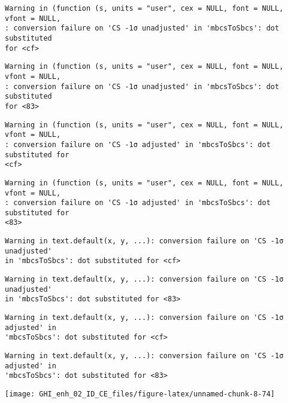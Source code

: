 \documentclass[
  10pt,
  a4paper,oneside]{article}
\begin{document}
\begin{verbatim}
Warning in (function (s, units = "user", cex = NULL, font = NULL, vfont = NULL,
: conversion failure on 'CS -1σ unadjusted' in 'mbcsToSbcs': dot substituted
for <cf>
\end{verbatim}

\begin{verbatim}
Warning in (function (s, units = "user", cex = NULL, font = NULL, vfont = NULL,
: conversion failure on 'CS -1σ unadjusted' in 'mbcsToSbcs': dot substituted
for <83>
\end{verbatim}

\begin{verbatim}
Warning in (function (s, units = "user", cex = NULL, font = NULL, vfont = NULL,
: conversion failure on 'CS -1σ adjusted' in 'mbcsToSbcs': dot substituted for
<cf>
\end{verbatim}

\begin{verbatim}
Warning in (function (s, units = "user", cex = NULL, font = NULL, vfont = NULL,
: conversion failure on 'CS -1σ adjusted' in 'mbcsToSbcs': dot substituted for
<83>
\end{verbatim}

\begin{verbatim}
Warning in text.default(x, y, ...): conversion failure on 'CS -1σ unadjusted'
in 'mbcsToSbcs': dot substituted for <cf>
\end{verbatim}

\begin{verbatim}
Warning in text.default(x, y, ...): conversion failure on 'CS -1σ unadjusted'
in 'mbcsToSbcs': dot substituted for <83>
\end{verbatim}

\begin{verbatim}
Warning in text.default(x, y, ...): conversion failure on 'CS -1σ adjusted' in
'mbcsToSbcs': dot substituted for <cf>
\end{verbatim}

\begin{verbatim}
Warning in text.default(x, y, ...): conversion failure on 'CS -1σ adjusted' in
'mbcsToSbcs': dot substituted for <83>
\end{verbatim}

\begin{center}\texttt{[image: GHI\_enh\_02\_ID\_CE\_files/figure-latex/unnamed-chunk-8-74]} \end{center}
\end{document}
